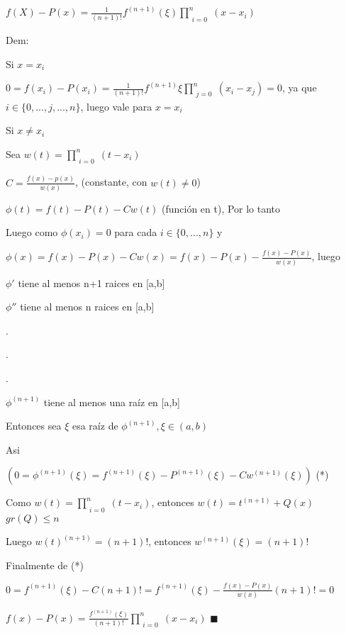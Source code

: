 \documentclass{article}
\begin{document}
$f(X)-P(x)= \displaystyle\frac{1}{(n+1)!} f^{(n+1)}(\xi) \prod\limits_{\substack{i=0}}^{n} ( x-x_i)$

Dem:

Si $x=x_i$

$0 = f(x_i)-P(x_i) = \displaystyle\frac{1}{(n+1)!} f^{(n+1)}\xi\prod\limits_{\substack{j=0}}^{n} ( x_i-x_j) = 0$, ya que $i \in \{0,...,j,...,n\}$, luego vale para $x=x_i$


Si $x\not=x_i$

Sea $w(t)=\prod\limits_{\substack{i=0}}^{n} (t-x_i)$

$C = \frac{f(x)-p(x)}{w(x)}$, (constante, con $w(t) \not= 0$)

$\phi(t) = f(t)-P(t) - Cw(t)$ (función en t), Por lo tanto

Luego como $\phi(x_i) = 0$ para cada $i\in\{ 0,...,n \}$ y 

$\phi(x) = f(x)-P(x)-Cw(x) = f(x) - P(x) - \frac{f(x) - P(x)}{w(x)}$, luego 

\vspace{5mm}

$\phi'$ tiene al menos n+1 raices en [a,b]

$\phi''$ tiene al menos n raices en [a,b]

.

.

.

$\phi^{(n+1)}$ tiene al menos una raíz en [a,b]

\vspace{5mm}

Entonces sea $\xi$ esa raíz de $\phi^{(n+1)}, \xi \in (a,b)$

Asi

$(0 = \phi^{(n+1)}(\xi) = f^{(n+1)}(\xi)-P^{(n+1)}(\xi) - Cw^{(n+1)}(\xi))$ (*)

\vspace{5mm}

Como $w(t)=\prod\limits_{\substack{i=0}}^{n} (t-x_i)$, entonces $ w(t) = t^{(n+1)} + Q(x) $ $gr(Q) \leq n$

Luego $w(t)^{(n+1)}=(n+1)!$, entonces $w^{(n+1)}(\xi) = (n+1)!$

\vspace{5mm}

Finalmente de (*)

$0 = f^{(n+1)}(\xi)- C(n+1)! = f^{(n+1)}(\xi) - \frac{f(x) - P(x)}{w(x)}(n+1)! = 0$

$f(x) - P(x) = \frac{f^{(n+1)}(\xi)}{(n+1)!}\prod\limits_{\substack{i=0}}^{n} ( x-x_i)$
$\blacksquare$
\end{document}
